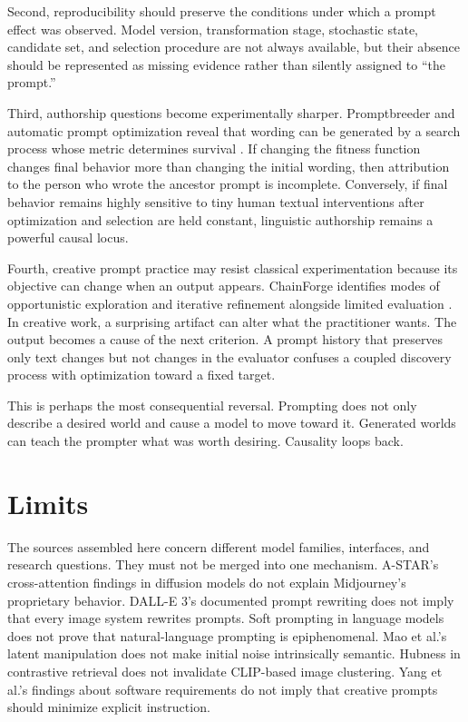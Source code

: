\documentclass[11pt]{article}
\begin{document}
Second, reproducibility should preserve the conditions under which a prompt effect was observed. Model version, transformation stage, stochastic state, candidate set, and selection procedure are not always available, but their absence should be represented as missing evidence rather than silently assigned to ``the prompt.''

Third, authorship questions become experimentally sharper. Promptbreeder and automatic prompt optimization reveal that wording can be generated by a search process whose metric determines survival \citep{Fernando2023Promptbreeder,Pryzant2023APO}. If changing the fitness function changes final behavior more than changing the initial wording, then attribution to the person who wrote the ancestor prompt is incomplete. Conversely, if final behavior remains highly sensitive to tiny human textual interventions after optimization and selection are held constant, linguistic authorship remains a powerful causal locus.

Fourth, creative prompt practice may resist classical experimentation because its objective can change when an output appears. ChainForge identifies modes of opportunistic exploration and iterative refinement alongside limited evaluation \citep{Arawjo2023ChainForge}. In creative work, a surprising artifact can alter what the practitioner wants. The output becomes a cause of the next criterion. A prompt history that preserves only text changes but not changes in the evaluator confuses a coupled discovery process with optimization toward a fixed target.

This is perhaps the most consequential reversal. Prompting does not only describe a desired world and cause a model to move toward it. Generated worlds can teach the prompter what was worth desiring. Causality loops back.

\section{Limits}

The sources assembled here concern different model families, interfaces, and research questions. They must not be merged into one mechanism. A-STAR's cross-attention findings in diffusion models do not explain Midjourney's proprietary behavior. DALL-E 3's documented prompt rewriting does not imply that every image system rewrites prompts. Soft prompting in language models does not prove that natural-language prompting is epiphenomenal. Mao et al.'s latent manipulation does not make initial noise intrinsically semantic. Hubness in contrastive retrieval does not invalidate CLIP-based image clustering. Yang et al.'s findings about software requirements do not imply that creative prompts should minimize explicit instruction.
\end{document}
